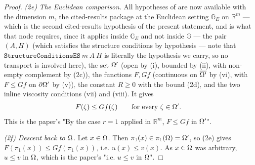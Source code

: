 \begin{proof}
\emph{(2e) The Euclidean comparison.} All hypotheses of
 are now available with the dimension $m$, the
cited-results package at the Euclidean setting $\mathbb G_E$ on $\mathbb R^{m}$ --- which is
the second cited-results hypothesis of the present statement, and is what that node requires,
since it applies  inside $\mathbb G_E$ and not inside
$\mathbb G$ --- the pair
$(A,H)$ (which satisfies the structure conditions by hypothesis --- note that
$\mathtt{StructureConditionsES}\ m\ A\ H$ is literally the hypothesis we carry, so no
transport is involved here), the set $\Omega'$ (open by (i), bounded by (ii), with non-empty
complement by (2c)), the functions $F,Gf$ (continuous on $\overline{\Omega'}$ by (vi), with
$F\le Gf$ on $\partial\Omega'$ by (v)), the constant $R\ge0$ with the bound (2d), and the two inline
viscosity conditions (vii) and (viii). It gives
\[
 F(\zeta)\le Gf(\zeta)\qquad\text{for every }\zeta\in\Omega' .
\]
This is the paper's "By the case $r=1$ applied in $\mathbb R^{m}$, $F\le Gf$ in $\Omega'$".

\emph{(2f) Descent back to $\Omega$.} Let $x\in\Omega$. Then $\pi_1(x)\in\pi_1(\Omega)=\Omega'$, so
(2e) gives $F(\pi_1(x))\le Gf(\pi_1(x))$, i.e. $u(x)\le v(x)$. As $x\in\Omega$ was arbitrary,
$u\le v$ in $\Omega$, which is the paper's "i.e. $u\le v$ in $\Omega$".
\end{proof}
